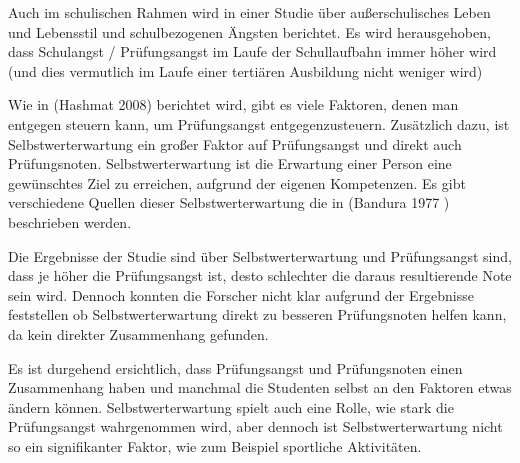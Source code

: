 \documentclass[11pt, a4paper]{article}
\begin{document}
	Auch im schulischen Rahmen wird in einer Studie über außerschulisches Leben und Lebensstil und schulbezogenen Ängsten berichtet. Es wird herausgehoben, dass Schulangst / Prüfungsangst im Laufe der Schullaufbahn immer höher wird (und dies vermutlich im Laufe einer tertiären Ausbildung nicht weniger wird) \cite{pixner2013prufungsangst}

	Wie in (Hashmat 2008) berichtet wird, gibt es viele Faktoren, denen man entgegen steuern kann, um Prüfungsangst entgegenzusteuern. Zusätzlich dazu, ist Selbstwerterwartung ein großer Faktor auf Prüfungsangst und direkt auch Prüfungsnoten. Selbstwerterwartung ist die Erwartung einer Person eine gewünschtes Ziel zu erreichen, aufgrund der eigenen Kompetenzen. Es gibt verschiedene Quellen dieser Selbstwerterwartung die in (Bandura 1977 \cite{bandura1977self}) beschrieben werden.

	Die Ergebnisse der Studie sind über Selbstwerterwartung und Prüfungsangst sind, dass je höher die Prüfungsangst ist, desto schlechter die daraus resultierende Note sein wird. Dennoch konnten die Forscher nicht klar aufgrund der Ergebnisse feststellen ob Selbstwerterwartung direkt zu besseren Prüfungsnoten helfen kann, da kein direkter Zusammenhang gefunden. \cite{barrows2013anxiety}

	Es ist durgehend ersichtlich, dass Prüfungsangst und Prüfungsnoten einen Zusammenhang haben und manchmal die Studenten selbst an den Faktoren etwas ändern können. Selbstwerterwartung spielt auch eine Rolle, wie stark die Prüfungsangst wahrgenommen wird, aber dennoch ist Selbstwerterwartung nicht so ein signifikanter Faktor, wie zum Beispiel sportliche Aktivitäten. \cite{barrows2013anxiety} \cite{hashmat2008factors}
\newpage

{}

\end{document}
